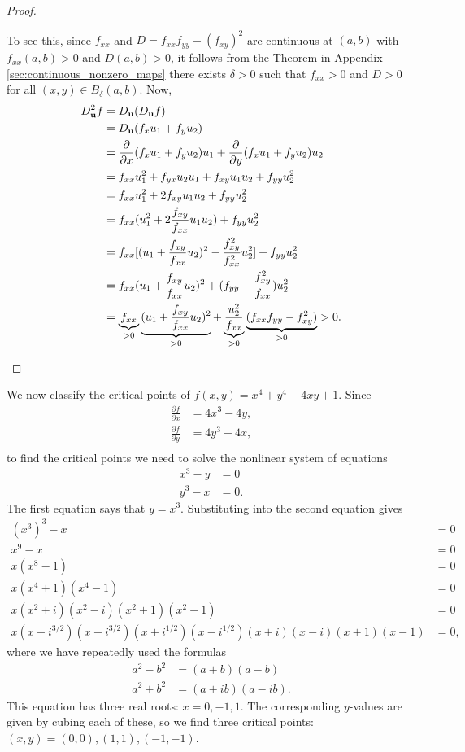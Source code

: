 \documentclass[12pt,letterpaper,reqno]{article}
\numberwithin{equation}{section}
\newcommand{\bu}{{\bf u}}
\begin{document}
{\begin{proof}
\begin{enumerate}[(a)]
		To see this, since $f_{xx}$ and $D=f_{xx}f_{yy}-(f_{xy})^2$ are continuous at $(a,b)$ with $f_{xx}(a,b)>0$ and $D(a,b)>0$, it follows from the Theorem in Appendix \ref{sec:continuous_nonzero_maps} there exists $\delta>0$ such that $f_{xx}>0$ and $D>0$ for all $(x,y) \in B_\delta(a,b)$. Now,
		\begin{align*}
			D^2_\bu f&=D_\bu(D_\bu f) \\
			&=D_\bu(f_xu_1+f_yu_2) \\
			&=\frac{\partial}{\partial x}(f_xu_1+f_yu_2)u_1+\frac{\partial}{\partial y}(f_xu_1+f_yu_2)u_2 \\
			&=f_{xx}u_1^2+f_{yx}u_2u_1+f_{xy}u_1u_2+f_{yy}u_2^2 \\
			&=f_{xx}u_1^2+2f_{xy}u_1u_2+f_{yy}u_2^2 \\
			&=f_{xx}(u_1^2+2\frac{f_{xy}}{f_{xx}}u_1u_2)+f_{yy}u_2^2 \\
			&=f_{xx}[(u_1+\frac{f_{xy}}{f_{xx}}u_2)^2-\frac{f_{xy}^2}{f_{xx}^2}u_2^2]+f_{yy}u_2^2 \\
			&=f_{xx}(u_1+\frac{f_{xy}}{f_{xx}}u_2)^2+(f_{yy}-\frac{f_{xy}^2}{f_{xx}})u_2^2 \\
			&=\underbrace{f_{xx}}_{>0}\underbrace{(u_1+\frac{f_{xy}}{f_{xx}}u_2)^2}_{>0}+\underbrace{\frac{u_2^2}{f_{xx}}}_{>0}\underbrace{(f_{xx}f_{yy}-f_{xy}^2)}_{>0}>0.
		\end{align*}
	\end{enumerate} 
\end{proof}

\begin{example}
We now classify the critical points of $f(x,y)=x^4+y^4-4xy+1$.	 Since
\begin{align*}
	\frac{\partial f}{\partial x}&=4x^3-4y, \\
	\frac{\partial f}{\partial y}&=4y^3-4x, \\
\end{align*}
to find the critical points we need to solve the nonlinear system of equations
\begin{align*}
	x^3-y&=0 \\
	y^3-x&=0.
\end{align*}
The first equation says that $y=x^3$. Substituting into the second equation gives
\begin{align*}
	(x^3)^3-x&=0 \\
	x^9-x&=0 \\
	x(x^8-1)&=0 \\
	x(x^4+1)(x^4-1)&=0 \\
	x(x^2+i)(x^2-i)(x^2+1)(x^2-1)&=0 \\
	x(x+i^{3/2})(x-i^{3/2})(x+i^{1/2})(x-i^{1/2})(x+i)(x-i)(x+1)(x-1)&=0,
\end{align*}
where we have repeatedly used the formulas
\begin{align*}
	a^2-b^2&=(a+b)(a-b) \\
	a^2+b^2&=(a+ib)(a-ib).
\end{align*}
This equation has three real roots: $x=0,-1,1$. The corresponding $y$-values are given by cubing each of these, so we find three critical points: $(x,y)=(0,0), (1,1), (-1,-1)$.


\end{example}}
\end{document}
